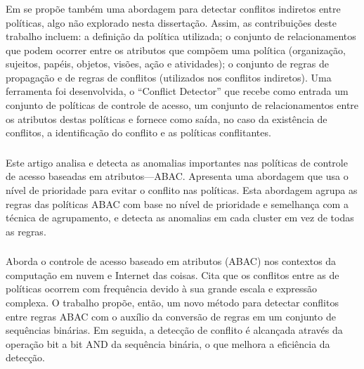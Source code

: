 \subsubsection{ }
Em  se propõe também uma abordagem para detectar conflitos indiretos entre políticas, algo não explorado nesta dissertação. Assim, as contribuições deste trabalho incluem: a definição da política utilizada; o conjunto de relacionamentos que podem ocorrer entre os atributos que compõem uma política (organização, sujeitos, papéis, objetos, visões, ação e atividades); o conjunto de regras de propagação e de regras de conflitos (utilizados nos conflitos indiretos). Uma ferramenta foi desenvolvida, o  ``Conflict Detector'' que recebe como entrada um conjunto de políticas de controle de acesso, um conjunto de relacionamentos entre os atributos destas políticas e fornece como saída, no caso da existência de conflitos, a identificação do conflito e as políticas conflitantes.

\subsubsection{ }
Este artigo analisa e detecta as anomalias importantes nas políticas de controle de acesso baseadas em atributos---ABAC. Apresenta uma abordagem que usa o nível de prioridade para evitar o conflito nas políticas. Esta abordagem agrupa as regras das políticas ABAC com base no nível de prioridade e semelhança com a técnica de agrupamento, e detecta as anomalias em cada cluster em vez de todas as regras.

\subsubsection{ }
Aborda o controle de acesso baseado em atributos (ABAC) nos contextos da computação em nuvem e Internet das coisas. Cita que os conflitos entre as de políticas ocorrem com frequência devido à sua grande escala e expressão complexa. O trabalho propõe, então, um novo método para detectar conflitos entre regras ABAC com o auxílio da conversão de regras em um conjunto de sequências binárias. Em seguida, a detecção de conflito é alcançada através da operação bit a bit AND da sequência binária, o que melhora a eficiência da detecção.

